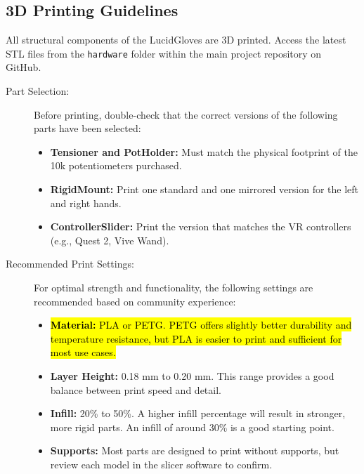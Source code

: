 \documentclass{article}
\begin{document}
\subsection{3D Printing Guidelines}
All structural components of the LucidGloves are 3D printed. Access the latest STL files from the \texttt{hardware} folder within the main project repository on GitHub.
\begin{description}
    \item[Part Selection:] Before printing, double-check that the correct versions of the following parts have been selected:
    \begin{itemize}
        \item \textbf{Tensioner and PotHolder:} Must match the physical footprint of the 10k potentiometers purchased.
        \item \textbf{RigidMount:} Print one standard and one mirrored version for the left and right hands.
        \item \textbf{ControllerSlider:} Print the version that matches the VR controllers (e.g., Quest 2, Vive Wand).
    \end{itemize}
    \item[Recommended Print Settings:] For optimal strength and functionality, the following settings are recommended based on community experience:
    \begin{itemize}
        \item \hl{\textbf{Material:} PLA or PETG. PETG offers slightly better durability and temperature resistance, but PLA is easier to print and sufficient for most use cases.}
        \item \textbf{Layer Height:} 0.18 mm to 0.20 mm. This range provides a good balance between print speed and detail.
        \item \textbf{Infill:} 20\% to 50\%. A higher infill percentage will result in stronger, more rigid parts. An infill of around 30\% is a good starting point.
        \item \textbf{Supports:} Most parts are designed to print without supports, but review each model in the slicer software to confirm.
    \end{itemize}
\end{description}
\end{document}
